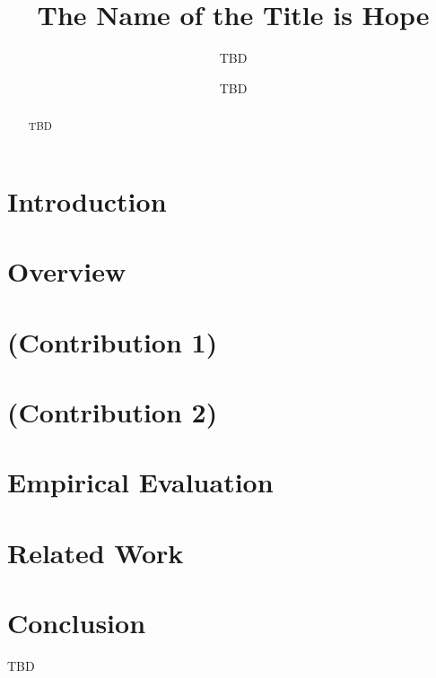 \documentclass[acmsmall,review,authorversion]{acmart}
\begin{document}
\title{The Name of the Title is Hope}

\author{TBD}
\author{TBD}


\begin{abstract}
  TBD
\end{abstract}

\maketitle

\section{Introduction}

\section{Overview}

\section{(Contribution 1)}

\section{(Contribution 2)}

\section{Empirical Evaluation}

\section{Related Work}

\section{Conclusion}

\begin{acks}
TBD
\end{acks}



\end{document}
